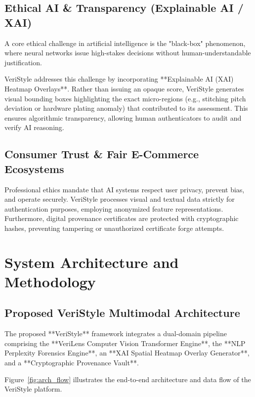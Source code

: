 \documentclass[a4paper,12pt]{report}
\begin{document}
\section{Ethical AI \& Transparency (Explainable AI / XAI)}
A core ethical challenge in artificial intelligence is the "black-box" phenomenon, where neural networks issue high-stakes decisions without human-understandable justification.

VeriStyle addresses this challenge by incorporating **Explainable AI (XAI) Heatmap Overlays**. Rather than issuing an opaque score, VeriStyle generates visual bounding boxes highlighting the exact micro-regions (e.g., stitching pitch deviation or hardware plating anomaly) that contributed to its assessment. This ensures algorithmic transparency, allowing human authenticators to audit and verify AI reasoning.

\section{Consumer Trust \& Fair E-Commerce Ecosystems}
Professional ethics mandate that AI systems respect user privacy, prevent bias, and operate securely. VeriStyle processes visual and textual data strictly for authentication purposes, employing anonymized feature representations. Furthermore, digital provenance certificates are protected with cryptographic hashes, preventing tampering or unauthorized certificate forge attempts.

\newpage

\chapter{System Architecture and Methodology}

\section{Proposed VeriStyle Multimodal Architecture}
The proposed **VeriStyle** framework integrates a dual-domain pipeline comprising the **VeriLens Computer Vision Transformer Engine**, the **NLP Perplexity Forensics Engine**, an **XAI Spatial Heatmap Overlay Generator**, and a **Cryptographic Provenance Vault**.

Figure~\ref{fig:arch_flow} illustrates the end-to-end architecture and data flow of the VeriStyle platform.
\end{document}
